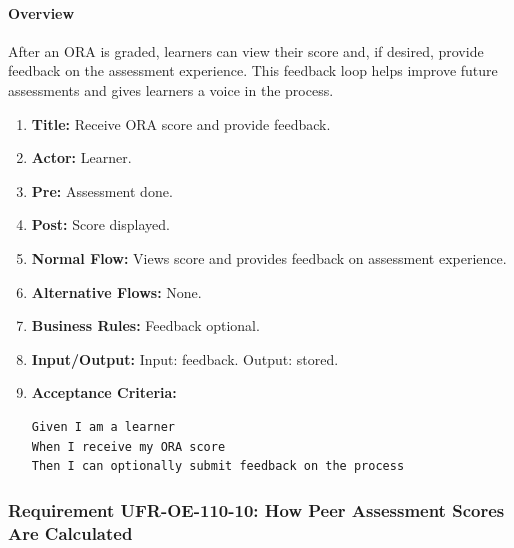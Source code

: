 \paragraph{Overview}
After an ORA is graded, learners can view their score and, if desired, provide feedback on the assessment experience. This feedback loop helps improve future assessments and gives learners a voice in the process.
\begin{enumerate}[label=\textbf{\arabic*.}]
\item \textbf{Title:} Receive ORA score and provide feedback.
\item \textbf{Actor:} Learner.
\item \textbf{Pre:} Assessment done.
\item \textbf{Post:} Score displayed.
\item \textbf{Normal Flow:} Views score and provides feedback on assessment experience.
\item \textbf{Alternative Flows:} None.
\item \textbf{Business Rules:} Feedback optional.
\item \textbf{Input/Output:} Input: feedback. Output: stored.
\item \textbf{Acceptance Criteria:}
    \begin{verbatim}
Given I am a learner
When I receive my ORA score
Then I can optionally submit feedback on the process
    \end{verbatim}
\end{enumerate}

\subsubsection{Requirement UFR-OE-110-10: How Peer Assessment Scores Are Calculated}
